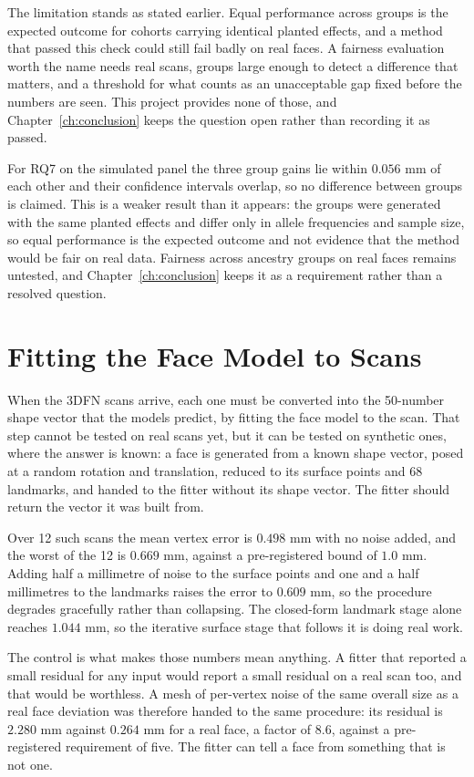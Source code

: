The limitation stands as stated earlier. Equal performance across groups is the expected outcome for cohorts carrying identical planted effects, and a method that passed this check could still fail badly on real faces. A fairness evaluation worth the name needs real scans, groups large enough to detect a difference that matters, and a threshold for what counts as an unacceptable gap fixed before the numbers are seen. This project provides none of those, and Chapter~\ref{ch:conclusion} keeps the question open rather than recording it as passed.

For RQ7 on the simulated panel the three group gains lie within $0.056$ mm of each other and their confidence intervals overlap, so no difference between groups is claimed. This is a weaker result than it appears: the groups were generated with the same planted effects and differ only in allele frequencies and sample size, so equal performance is the expected outcome and not evidence that the method would be fair on real data. Fairness across ancestry groups on real faces remains untested, and Chapter~\ref{ch:conclusion} keeps it as a requirement rather than a resolved question.

\section{Fitting the Face Model to Scans}
\label{sec:res-flame}
When the 3DFN scans arrive, each one must be converted into the 50-number shape vector that the models predict, by fitting the face model to the scan. That step cannot be tested on real scans yet, but it can be tested on synthetic ones, where the answer is known: a face is generated from a known shape vector, posed at a random rotation and translation, reduced to its surface points and 68 landmarks, and handed to the fitter without its shape vector. The fitter should return the vector it was built from.

Over 12 such scans the mean vertex error is $0.498$ mm with no noise added, and the worst of the 12 is $0.669$ mm, against a pre-registered bound of $1.0$ mm. Adding half a millimetre of noise to the surface points and one and a half millimetres to the landmarks raises the error to $0.609$ mm, so the procedure degrades gracefully rather than collapsing. The closed-form landmark stage alone reaches $1.044$ mm, so the iterative surface stage that follows it is doing real work.

The control is what makes those numbers mean anything. A fitter that reported a small residual for any input would report a small residual on a real scan too, and that would be worthless. A mesh of per-vertex noise of the same overall size as a real face deviation was therefore handed to the same procedure: its residual is $2.280$ mm against $0.264$ mm for a real face, a factor of $8.6$, against a pre-registered requirement of five. The fitter can tell a face from something that is not one.

